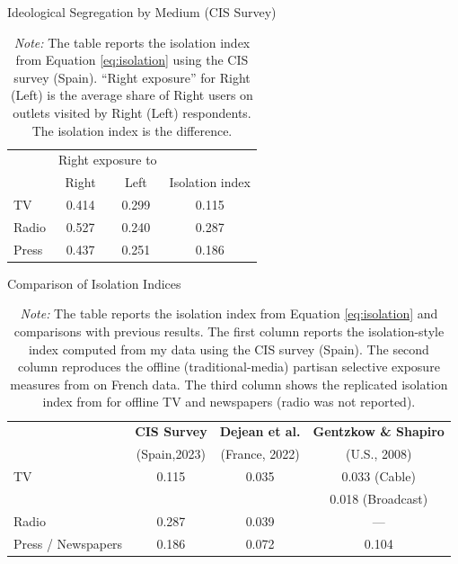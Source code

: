 \documentclass[12pt]{article}
\begin{document}
\begin{table}[H]
\caption{Ideological Segregation by Medium (CIS Survey)}
\label{tab:isolation_table}

\centering
\begin{tabular}{lccc}
	\hline
	& \multicolumn{2}{c}{Right exposure to } & \\
	\cline{2-3}
	& Right & Left & Isolation index \\
	\hline
	TV    & 0.414 & 0.299 & 0.115 \\
	Radio & 0.527 & 0.240 & 0.287 \\
	Press & 0.437 & 0.251 & 0.186 \\
	\hline
\end{tabular}



\caption*{\small  \textit{Note:} The table reports the isolation index from Equation \eqref{eq:isolation}  using the CIS survey (Spain). “Right exposure” for Right (Left) is the average share of Right users on outlets visited by Right (Left) respondents. The isolation index is the difference.}

\end{table}




\begin{table}[H]
\caption{Comparison of Isolation Indices}
\label{tab:isolation_table_compare}
\centering
\begin{tabular}{lccc}
	\hline
	& \textbf{CIS Survey} & \textbf{Dejean et al.} & \textbf{Gentzkow \& Shapiro} \\
	&  (Spain,2023) & (France, 2022) &  (U.S., 2008) \\
	\hline
	TV & 0.115 & 0.035 & 0.033 \scriptsize{(Cable)}\\
	&  &  & \hspace{0.45cm} 0.018 \scriptsize{(Broadcast)} \\
	Radio & 0.287 & 0.039 & — \\
	Press / Newspapers & 0.186 & 0.072 & 0.104\\
	\hline
\end{tabular}
\caption*{\small  \textit{Note:} The table reports the isolation index from Equation \eqref{eq:isolation} and comparisons with previous results. 
	The first column reports the isolation-style index computed from my data using the CIS survey (Spain).
	The second column reproduces the offline (traditional-media) partisan selective exposure measures from \cite{Dejean2022PartisanSE} on French data. 
	The third column shows the replicated isolation index from \cite{gentzkow_isolation} for offline TV and newspapers (radio was not reported).}

\end{table}
\end{document}
